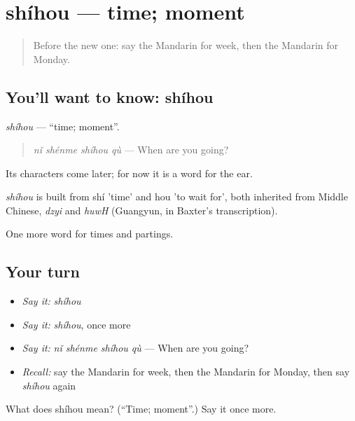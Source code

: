 \section[shíhou]{shíhou — time; moment}

\label{lesson:ZH-C46-shihou}



\begin{quote}
Before the new one: say the Mandarin for week, then the Mandarin for Monday.
\end{quote}

\subsection*{You'll want to know: shíhou}
\emph{shíhou} — \textquotedblleft{}time; moment\textquotedblright{}.

\begin{quote}
\emph{nǐ shénme shíhou qù} — When are you going?
\end{quote}

Its characters come later; for now it is a word for the ear.

\begin{cousinweb}
\emph{shíhou} is built from shí 'time' and hou 'to wait for', both inherited from Middle Chinese, \emph{dzyi} and \emph{huwH} (Guangyun, in Baxter's transcription).
\end{cousinweb}

\begin{grammarlens}[title={What you've built}]
One more word for times and partings.
\end{grammarlens}

\subsection*{Your turn}
\begin{itemize}
\raggedright
  \item \emph{Say it:} \emph{shíhou}
  \item \emph{Say it:} \emph{shíhou}, once more
  \item \emph{Say it:} \emph{nǐ shénme shíhou qù} — When are you going?
  \item \emph{Recall:} say the Mandarin for week, then the Mandarin for Monday, then say \emph{shíhou} again
\end{itemize}

\begin{tcolorbox}[breakable,colback=teal!4,colframe=teal!35!black,title={Before you move on}]
What does shíhou mean? (\textquotedblleft{}Time; moment\textquotedblright{}.) Say it once more.
\end{tcolorbox}
